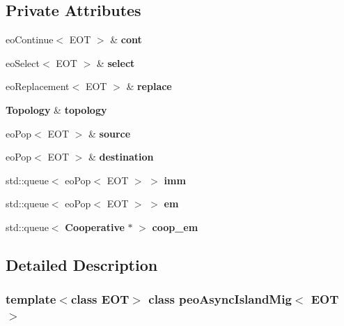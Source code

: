 \subsection*{Private Attributes}
\begin{CompactItemize}
\item 
eo\-Continue$<$ EOT $>$ \& {\bf cont}\label{classpeo_async_island_mig_2fc077d02ef9ea4595cfe883af0d4f83}

\item 
eo\-Select$<$ EOT $>$ \& {\bf select}\label{classpeo_async_island_mig_b1fa045094c8a411323e75b5820c80c2}

\item 
eo\-Replacement$<$ EOT $>$ \& {\bf replace}\label{classpeo_async_island_mig_b761dbd880ee32e170741ecd78da6f48}

\item 
{\bf Topology} \& {\bf topology}\label{classpeo_async_island_mig_e45e5a808a96f0853ab6ba42339fe679}

\item 
eo\-Pop$<$ EOT $>$ \& {\bf source}\label{classpeo_async_island_mig_8a502d82c773033e274dca932fc2d4ee}

\item 
eo\-Pop$<$ EOT $>$ \& {\bf destination}\label{classpeo_async_island_mig_e407f411d08ae7d96992603c145a7e43}

\item 
std::queue$<$ eo\-Pop$<$ EOT $>$ $>$ {\bf imm}\label{classpeo_async_island_mig_b8c76d98d9ae99dd930a77c12860519a}

\item 
std::queue$<$ eo\-Pop$<$ EOT $>$ $>$ {\bf em}\label{classpeo_async_island_mig_a9cc0e2d61cac6e11647b141962adc89}

\item 
std::queue$<$ {\bf Cooperative} $\ast$ $>$ {\bf coop\_\-em}\label{classpeo_async_island_mig_1a2c0004d23bc303420af137a8c8bd27}

\end{CompactItemize}


\subsection{Detailed Description}
\subsubsection*{template$<$class EOT$>$ class peo\-Async\-Island\-Mig$<$ EOT $>$}

